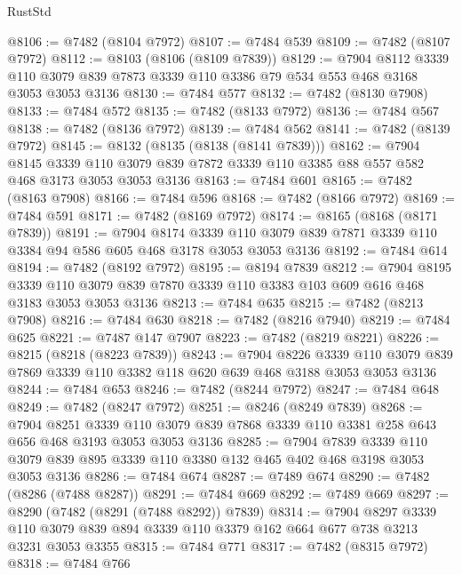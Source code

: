 \begin{lexlean}{RustStd}
\begin{coremodule}
@8106 := @7482 (@8104 @7972)
@8107 := @7484 @539
@8109 := @7482 (@8107 @7972)
@8112 := @8103 (@8106 (@8109 @7839))
@8129 := @7904
    @8112
    @3339
    @110
    @3079
    @839
    @7873
    @3339
    @110
    @3386
    @79
    @534
    @553
    @468
    @3168
    @3053
    @3053
    @3136
@8130 := @7484 @577
@8132 := @7482 (@8130 @7908)
@8133 := @7484 @572
@8135 := @7482 (@8133 @7972)
@8136 := @7484 @567
@8138 := @7482 (@8136 @7972)
@8139 := @7484 @562
@8141 := @7482 (@8139 @7972)
@8145 := @8132 (@8135 (@8138 (@8141 @7839)))
@8162 := @7904
    @8145
    @3339
    @110
    @3079
    @839
    @7872
    @3339
    @110
    @3385
    @88
    @557
    @582
    @468
    @3173
    @3053
    @3053
    @3136
@8163 := @7484 @601
@8165 := @7482 (@8163 @7908)
@8166 := @7484 @596
@8168 := @7482 (@8166 @7972)
@8169 := @7484 @591
@8171 := @7482 (@8169 @7972)
@8174 := @8165 (@8168 (@8171 @7839))
@8191 := @7904
    @8174
    @3339
    @110
    @3079
    @839
    @7871
    @3339
    @110
    @3384
    @94
    @586
    @605
    @468
    @3178
    @3053
    @3053
    @3136
@8192 := @7484 @614
@8194 := @7482 (@8192 @7972)
@8195 := @8194 @7839
@8212 := @7904
    @8195
    @3339
    @110
    @3079
    @839
    @7870
    @3339
    @110
    @3383
    @103
    @609
    @616
    @468
    @3183
    @3053
    @3053
    @3136
@8213 := @7484 @635
@8215 := @7482 (@8213 @7908)
@8216 := @7484 @630
@8218 := @7482 (@8216 @7940)
@8219 := @7484 @625
@8221 := @7487 @147 @7907
@8223 := @7482 (@8219 @8221)
@8226 := @8215 (@8218 (@8223 @7839))
@8243 := @7904
    @8226
    @3339
    @110
    @3079
    @839
    @7869
    @3339
    @110
    @3382
    @118
    @620
    @639
    @468
    @3188
    @3053
    @3053
    @3136
@8244 := @7484 @653
@8246 := @7482 (@8244 @7972)
@8247 := @7484 @648
@8249 := @7482 (@8247 @7972)
@8251 := @8246 (@8249 @7839)
@8268 := @7904
    @8251
    @3339
    @110
    @3079
    @839
    @7868
    @3339
    @110
    @3381
    @258
    @643
    @656
    @468
    @3193
    @3053
    @3053
    @3136
@8285 := @7904
    @7839
    @3339
    @110
    @3079
    @839
    @895
    @3339
    @110
    @3380
    @132
    @465
    @402
    @468
    @3198
    @3053
    @3053
    @3136
@8286 := @7484 @674
@8287 := @7489 @674
@8290 := @7482 (@8286 (@7488 @8287))
@8291 := @7484 @669
@8292 := @7489 @669
@8297 := @8290 (@7482 (@8291 (@7488 @8292)) @7839)
@8314 := @7904
    @8297
    @3339
    @110
    @3079
    @839
    @894
    @3339
    @110
    @3379
    @162
    @664
    @677
    @738
    @3213
    @3231
    @3053
    @3355
@8315 := @7484 @771
@8317 := @7482 (@8315 @7972)
@8318 := @7484 @766

\end{coremodule}
\end{lexlean}

